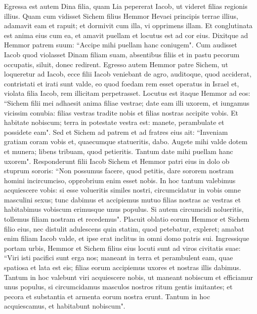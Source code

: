 \begin{biblechapter}  
\verse Egressa est autem Dina filia, quam Lia pepererat Iacob, ut videret filias regionis illius. 
\verse Quam cum vidisset Sichem filius Hemmor Hevaei principis terrae illius, adamavit eam et rapuit; et dormivit cum illa, vi opprimens illam.  
\verse Et conglutinata est anima eius cum ea, et amavit puellam et locutus est ad cor eius. 
\verse Dixitque ad Hemmor patrem suum: “Accipe mihi puellam hanc coniugem". 
\verse Cum audisset Iacob quod violasset Dinam filiam suam, absentibus filiis et in pastu pecorum occupatis, siluit, donec redirent. 
\verse Egresso autem Hemmor patre Sichem, ut loqueretur ad Iacob, 
\verse ecce filii Iacob veniebant de agro, auditoque, quod acciderat, contristati et irati sunt valde, eo quod foedam rem esset operatus in Israel et, violata filia Iacob, rem illicitam perpetrasset. 
\verse Locutus est itaque Hemmor ad eos: “Sichem filii mei adhaesit anima filiae vestrae; date eam illi uxorem, 
\verse et iungamus vicissim conubia: filias vestras tradite nobis et filias nostras accipite vobis. 
\verse Et habitate nobiscum; terra in potestate vestra est: manete, perambulate et possidete eam".  
\verse Sed et Sichem ad patrem et ad fratres eius ait: “Inveniam gratiam coram vobis et, quaecumque statueritis, dabo. 
\verse Augete mihi valde dotem et munera; libens tribuam, quod petieritis. Tantum date mihi puellam hanc uxorem". 
\verse Responderunt filii Iacob Sichem et Hemmor patri eius in dolo ob stuprum sororis: 
\verse “Non possumus facere, quod petitis, dare sororem nostram homini incircumciso, opprobrium enim esset nobis. 
\verse In hoc tantum valebimus acquiescere vobis: si esse volueritis similes nostri, circumcidatur in vobis omne masculini sexus; 
\verse tunc dabimus et accipiemus mutuo filias nostras ac vestras et habitabimus vobiscum erimusque unus populus. 
\verse Si autem circumcidi nolueritis, tollemus filiam nostram et recedemus". 
\verse Placuit oblatio eorum Hemmor et Sichem filio eius, 
\verse nec distulit adulescens quin statim, quod petebatur, expleret; amabat enim filiam Iacob valde, et ipse erat inclitus in omni domo patris sui. 
\verse Ingressique portam urbis, Hemmor et Sichem filius eius locuti sunt ad viros civitatis suae: 
\verse “Viri isti pacifici sunt erga nos; maneant in terra et perambulent eam, quae spatiosa et lata est eis; filias eorum accipiemus uxores et nostras illis dabimus. 
\verse Tantum in hoc valebunt viri acquiescere nobis, ut maneant nobiscum et efficiamur unus populus, si circumcidamus masculos nostros ritum gentis imitantes; 
\verse et pecora et substantia et armenta eorum nostra erunt. Tantum in hoc acquiescamus, et habitabunt nobiscum". 

\end{biblechapter}
